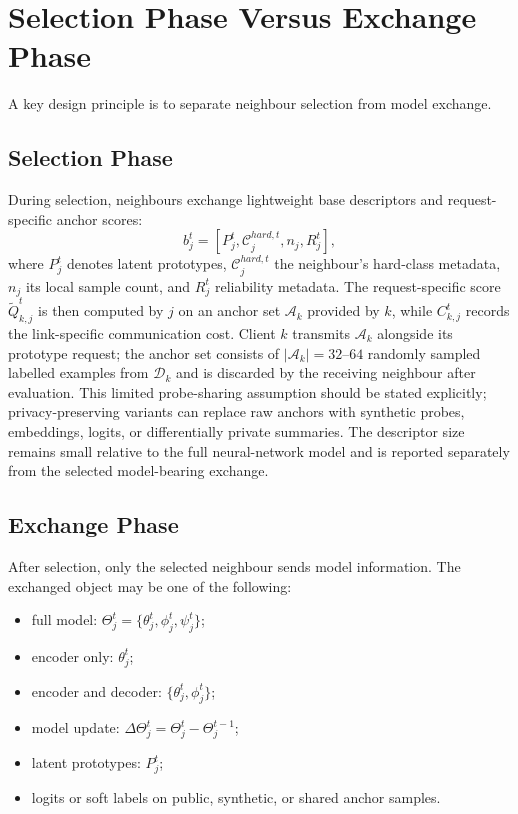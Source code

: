 \documentclass[conference]{IEEEtran}
\newcommand{\rev}[1]{#1}
\begin{document}
\section{Selection Phase Versus Exchange Phase}
\label{sec:selection-phase-versus-exchange-phase}

A key design principle is to separate neighbour selection from model exchange.

\subsection{Selection Phase}
\label{subsec:selection-phase}
During selection, neighbours exchange lightweight base descriptors and request-specific anchor scores:
\begin{equation*}
    \rev{b_j^t = [P_j^t,\mathcal{C}_j^{hard,t}, n_j, R_j^t]},
\end{equation*}
where \(P_j^t\) denotes latent prototypes, \rev{\(\mathcal{C}_j^{hard,t}\) the neighbour's hard-class metadata, \(n_j\) its local sample count, and \(R_j^t\) reliability metadata. The request-specific score \(\tilde{Q}_{k,j}^t\) is then computed by \(j\) on an anchor set \(\mathcal{A}_k\) provided by \(k\), while \(C_{k,j}^t\) records the link-specific communication cost.} Client \(k\) transmits \(\mathcal{A}_k\) alongside its prototype request; the anchor set consists of \(|\mathcal{A}_k| = 32\)--\(64\) randomly sampled labelled examples from \(\mathcal{D}_k\) and is discarded by the receiving neighbour after evaluation. This limited probe-sharing assumption should be stated explicitly; privacy-preserving variants can replace raw anchors with synthetic probes, embeddings, logits, or differentially private summaries. The descriptor size remains small relative to the full neural-network model and is reported separately from the selected model-bearing exchange.

\subsection{Exchange Phase}
\label{subsec:exchange-phase}
After selection, only the selected neighbour sends model information. The exchanged object may be one of the following:
\begin{itemize}
    \item full model: \(\Theta_j^t=\{\theta_j^t,\phi_j^t,\psi_j^t\}\);
    \item encoder only: \(\theta_j^t\);
    \item encoder and decoder: \(\{\theta_j^t,\phi_j^t\}\);
    \item model update: \(\Delta\Theta_j^t=\Theta_j^t-\Theta_j^{t-1}\);
    \item latent prototypes: \(P_j^t\);
    \item logits or soft labels on public, synthetic, or shared anchor samples.
\end{itemize}
\end{document}
